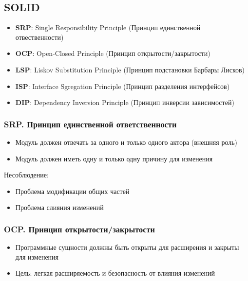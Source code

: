\subsection{SOLID}

\begin{itemize}
    \item \textbf{SRP}: Single Responsibility Principle
        (Принцип единственной отвественности)
    \item \textbf{OCP}: Open-Closed Principle
        (Принцип открытости/закрытости)
    \item \textbf{LSP}: Liskov Substitution Principle
        (Принцип подстановки Барбары Лисков)
    \item \textbf{ISP}: Interface Sgregation Principle
        (Принцип разделения интерфейсов)
    \item \textbf{DIP}: Dependency Inversion Principle
        (Принцип инверсии зависимостей)
\end{itemize}

\subsubsection{SRP. Принцип единственной ответственности}

\begin{itemize}
    \item Модуль должен отвечать за одного и только одного
        актора (внешняя роль)
    \item Модуль должен иметь одну и только одну причину для
        изменения
\end{itemize}

Несоблюдение:

\begin{itemize}
    \item Проблема модификации общих частей
    \item Проблема слияния изменений
\end{itemize}

\subsubsection{OCP. Принцип открытости/закрытости}

\begin{itemize}
    \item Программные сущности должны быть открыты для расширения
        и закрыты для изменения
    \item Цель: легкая расширяемость и безопасность от влияния
        изменений
\end{itemize}

